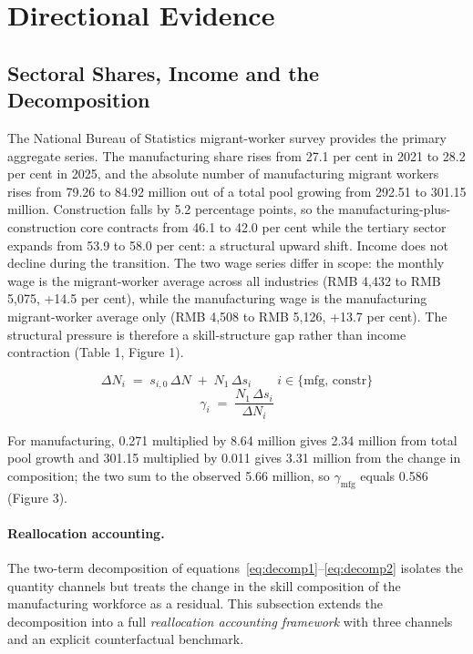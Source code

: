\documentclass[12pt]{article}
\begin{document}
\section{Directional Evidence}

\subsection{Sectoral Shares, Income and the Decomposition}

The National Bureau of Statistics migrant-worker survey provides the primary aggregate series. The manufacturing share rises from 27.1 per cent in 2021 to 28.2 per cent in 2025, and the absolute number of manufacturing migrant workers rises from 79.26 to 84.92 million out of a total pool growing from 292.51 to 301.15 million. Construction falls by 5.2 percentage points, so the manufacturing-plus-construction core contracts from 46.1 to 42.0 per cent while the tertiary sector expands from 53.9 to 58.0 per cent: a structural upward shift. Income does not decline during the transition. The two wage series differ in scope: the monthly wage is the migrant-worker average across all industries (RMB 4,432 to RMB 5,075, +14.5 per cent), while the manufacturing wage is the manufacturing migrant-worker average only (RMB 4,508 to RMB 5,126, +13.7 per cent). The structural pressure is therefore a skill-structure gap rather than income contraction (Table 1, Figure 1).





\begin{equation}
\Delta N_{i} \;=\; s_{i,0}\,\Delta N \;+\; N_{1}\,\Delta s_{i} \qquad i \in \{\mathrm{mfg},\,\mathrm{constr}\} \label{eq:decomp1}
\end{equation}
\begin{equation}
\gamma_{i} \;=\; \frac{N_{1}\,\Delta s_{i}}{\Delta N_{i}} \label{eq:decomp2}
\end{equation}

For manufacturing, 0.271 multiplied by 8.64 million gives 2.34 million from total pool growth and 301.15 multiplied by 0.011 gives 3.31 million from the change in composition; the two sum to the observed 5.66 million, so $\gamma_{\mathrm{mfg}}$ equals 0.586 (Figure 3).


\paragraph{Reallocation accounting.} The two-term decomposition of equations~\eqref{eq:decomp1}--\eqref{eq:decomp2} isolates the quantity channels but treats the change in the skill composition of the manufacturing workforce as a residual. This subsection extends the decomposition into a full \emph{reallocation accounting framework} with three channels and an explicit counterfactual benchmark.
\end{document}
